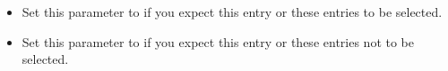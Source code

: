 
\begin{itemize}
\item Set this parameter to  if you expect this entry or these entries to be selected. 
\item Set this parameter to  if you expect this entry or these entries not to be selected. 
\end{itemize}

